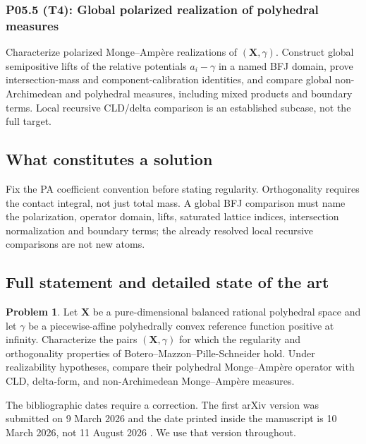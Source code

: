 \documentclass[11pt,a4paper]{article}
\theoremstyle{definition}
\newtheorem{problem}{Problem}[section]
\theoremstyle{remark}
\begin{document}
\subsubsection*{P05.5 (T4): Global polarized realization of polyhedral measures}
\label{atom:P05.5}
Characterize polarized Monge--Ampère realizations of \((\mathbf X,\gamma)\). Construct global semipositive lifts of the relative potentials \(a_i-\gamma\) in a named BFJ domain, prove intersection-mass and component-calibration identities, and compare global non-Archimedean and polyhedral measures, including mixed products and boundary terms. Local recursive CLD/delta comparison is an established subcase, not the full target.

\subsection{What constitutes a solution}
Fix the PA coefficient convention before stating regularity. Orthogonality requires the contact integral, not just total mass. A global BFJ comparison must name the polarization, operator domain, lifts, saturated lattice indices, intersection normalization and boundary terms; the already resolved local recursive comparisons are not new atoms.

\subsection{Full statement and detailed state of the art}
\label{sec:ch72-polyhedral}

\begin{problem}\label{prob:frontier-polyhedral-regularity}
Let \(\mathbf X\) be a pure-dimensional balanced rational polyhedral space
and let \(\gamma\) be a piecewise-affine polyhedrally convex reference
function positive at infinity.  Characterize the pairs
\((\mathbf X,\gamma)\) for which the
regularity and orthogonality properties of Botero--Mazzon--Pille-Schneider
hold.  Under realizability hypotheses, compare their polyhedral
Monge--Amp\`ere operator with CLD, delta-form, and non-Archimedean
Monge--Amp\`ere measures.
\end{problem}

The bibliographic dates require a correction.  The first arXiv version was
submitted on 9 March 2026 and the date printed inside the manuscript is
10 March 2026, not 11 August 2026 \cite{BMPS26}.  We use that version
throughout.
\end{document}
